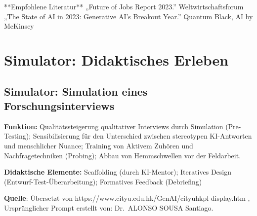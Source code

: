 \documentclass[
  ngerman,
  letterpaper,
  DIV=11]{scrreprt}
\newenvironment{Shaded}{\begin{snugshade}}{\end{snugshade}}
\newcommand{\NormalTok}[1]{\textcolor[rgb]{0.00,0.23,0.31}{#1}}
\begin{document}
\begin{tcolorbox}
\begin{Shaded}
\begin{Highlighting}[]
\NormalTok{**Empfohlene Literatur**}
\NormalTok{„Future of Jobs Report 2023.” Weltwirtschaftsforum}
\NormalTok{„The State of AI in 2023: Generative AI’s Breakout Year.” Quantum Black, AI by McKinsey}

\end{Highlighting}
\end{Shaded}

\end{tcolorbox}

\section{Simulator: Didaktisches
Erleben}\label{simulator-didaktisches-erleben}

\subsection{Simulator: Simulation eines
Forschungsinterviews}\label{sec-prompt-interview-simulator}

\textbf{Funktion:} Qualitätssteigerung qualitativer Interviews durch
Simulation (Pre-Testing); Sensibilisierung für den Unterschied zwischen
stereotypen KI-Antworten und menschlicher Nuance; Training von Aktivem
Zuhören und Nachfragetechniken (Probing); Abbau von Hemmschwellen vor
der Feldarbeit.

\textbf{Didaktische Elemente:} Scaffolding (durch KI-Mentor); Iteratives
Design (Entwurf-Test-Überarbeitung); Formatives Feedback (Debriefing)

\textbf{Quelle}: Übersetzt von
https://www.cityu.edu.hk/GenAI/cityuhkpl-display.htm , Ursprünglicher
Prompt erstellt von: Dr.~ALONSO SOUSA Santiago.
\end{document}
